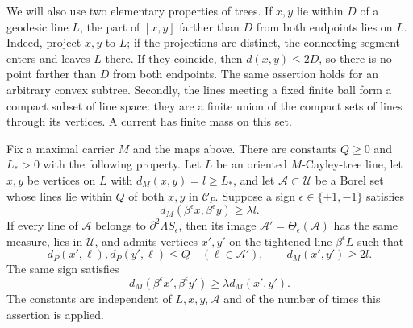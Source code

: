 We will also use two elementary properties of trees. If $x,y$ lie
within $D$ of a geodesic line $L$, the part of $[x,y]$ farther than
$D$ from both endpoints lies on $L$. Indeed, project $x,y$ to $L$;
if the projections are distinct, the connecting segment enters and
leaves $L$ there. If they coincide, then $d(x,y)\le2D$, so there
is no point farther than $D$ from both endpoints.
The same assertion holds for an arbitrary convex subtree. Secondly,
the lines meeting a fixed finite ball form a compact subset of line
space: they are a finite union of the compact sets of lines through
its vertices. A current has finite mass on this set.

\begin{lemma}
\label{exp:trimming}
Fix a maximal carrier $M$ and the maps above. There are constants
$Q\ge0$ and $L_*>0$ with the following property. Let $L$ be an
oriented $M$-Cayley-tree line, let $x,y$ be vertices on $L$ with
$d_M(x,y)=l\ge L_*$, and let $\mathcal A\subset\mathcal U$ be
a Borel set whose lines lie within $Q$ of both $x,y$ in
$\mathcal C_P$. Suppose a sign $\epsilon\in\{+1,-1\}$ satisfies
\[
 d_M(\beta^\epsilon x,\beta^\epsilon y)\ge\lambda l.
\]
If every line of $\mathcal A$ belongs to
$\partial^2\Lambda S_\epsilon$, then its image
$\mathcal A'=\Theta_\epsilon(\mathcal A)$ has the same measure,
lies in $\mathcal U$, and admits vertices $x',y'$ on the tightened
line $\beta^\epsilon L$ such that
\[
 d_P(x',\ell),d_P(y',\ell)\le Q\quad(\ell\in\mathcal A'),
 \qquad d_M(x',y')\ge2l.
\]
The same sign satisfies
\[
 d_M(\beta^\epsilon x',\beta^\epsilon y')
 \ge\lambda d_M(x',y').
\]
The constants are independent of $L,x,y,\mathcal A$ and of the
number of times this assertion is applied.
\end{lemma}

